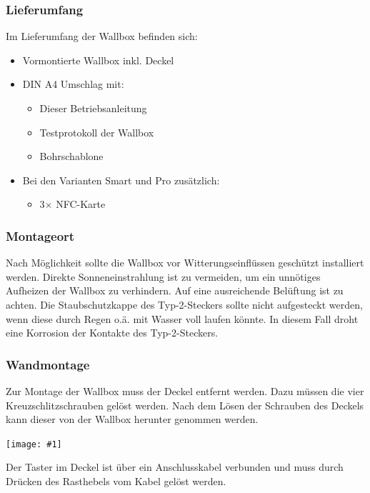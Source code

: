 \documentclass[a4paper,10pt]{article}
\newcommand{\hint}[1]{\begin{tcolorbox}[colback=boxgray,colframe=black,coltext=
white,title=Hinweis,left*=2mm,right*=2mm,boxsep=1mm,bottom=1mm,top=1mm]#1\end{tcolorbox}}
\newcommand{\gfx}[1]{\texttt{[image: \#1]}}
\begin{document}
\begin{multicols*}{2}
    \subsubsection{Lieferumfang}
    Im Lieferumfang der Wallbox befinden sich:
    \begin{itemize}
        \item Vormontierte Wallbox inkl. Deckel
        \item DIN A4 Umschlag mit:
        \begin{itemize}
            \item Dieser Betriebsanleitung
            \item Testprotokoll der Wallbox
            \item Bohrschablone
        \end{itemize}
		\item Bei den Varianten Smart und Pro zusätzlich:
        \begin{itemize}
        	\item 3$\times$ NFC-Karte
        \end{itemize}
    \end{itemize}

    \subsubsection{Montageort}
    Nach Möglichkeit sollte die Wallbox vor Witterungseinflüssen geschützt
    installiert werden. Direkte Sonneneinstrahlung ist zu vermeiden, um ein
    unnötiges Aufheizen der Wallbox zu verhindern. Auf eine ausreichende Belüftung
    ist zu achten. Die Staubschutzkappe des Typ-2-Steckers sollte nicht aufgesteckt
    werden, wenn diese durch Regen o.ä. mit Wasser voll laufen könnte. In diesem Fall
    droht eine Korrosion der Kontakte des Typ-2-Steckers.

    \subsubsection{Wandmontage}\label{wandmontage}
    Zur Montage der Wallbox muss der Deckel entfernt werden. Dazu müssen die
    vier Kreuzschlitzschrauben gelöst werden.
    Nach dem Lösen der Schrauben des Deckels kann dieser von der Wallbox herunter genommen
    werden.

    \gfx{./img_warp2/resized/warp_screw_points_ready}


    \hint{Der Taster im Deckel ist über ein Anschlusskabel verbunden und muss
        durch Drücken des Rasthebels vom Kabel gelöst werden.}


\end{multicols*}
\end{document}
